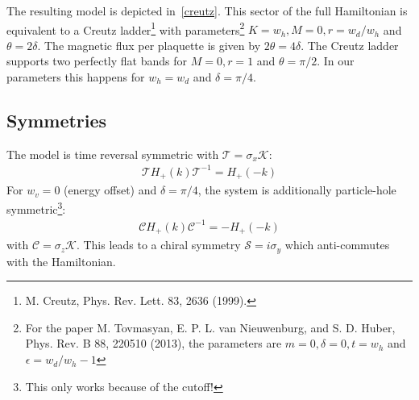 

The resulting model is depicted in~\cref{creutz}.
This sector of the full Hamiltonian is equivalent to a Creutz ladder\footnote{M. Creutz, Phys. Rev. Lett. 83, 2636 (1999).} with parameters\footnote{For the paper M. Tovmasyan, E. P. L. van Nieuwenburg, and S. D. Huber, Phys. Rev. B 88, 220510 (2013), the parameters are $m=0, \delta=0, t=w_h$ and $\epsilon=w_d/w_h-1$} $K=w_h, M=0, r=w_d/w_h$ and $\theta=2\delta$. The magnetic flux per plaquette is given by $2\theta=4\delta$. The Creutz ladder supports two perfectly flat bands for $M=0, r=1$ and $\theta=\pi/2$. In our parameters this happens for $w_h=w_d$ and $\delta=\pi/4$.


\subsection{Symmetries}
The model is time reversal symmetric with $\mathcal{T}=\sigma_x \mathcal{K}$:
\begin{align}
    \mathcal{T}H_+(k)\mathcal{T}^{-1}= H_+(-k)
\end{align}
For $w_v=0$ (energy offset) and $\delta=\pi/4$, the system is additionally particle-hole symmetric\footnote{This only works because of the cutoff!}:
\begin{align}
    \mathcal{C}H_+(k)\mathcal{C}^{-1}= -H_+(-k)
\end{align}
with $\mathcal{C}= \sigma_z \mathcal{K}$. This leads to a chiral symmetry $\mathcal{S} = i\sigma_y$ which anti-commutes with the Hamiltonian.

